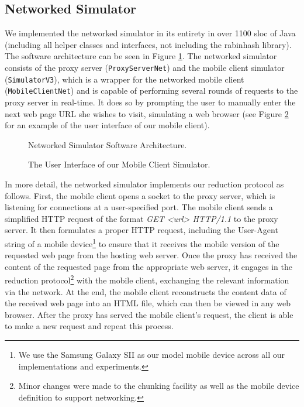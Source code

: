 \subsection{Networked Simulator}
\label{sec:netsim}
We implemented the networked simulator in its entirety in over 1100 sloc of Java (including all helper classes and interfaces, not including the rabinhash library). The software architecture can be seen in Figure \ref{fig:netsim_arch}. The networked simulator consists of the proxy server (\texttt{ProxyServerNet}) and the mobile client simulator (\texttt{SimulatorV3}), which is a wrapper for the networked mobile client (\texttt{MobileClientNet}) and is capable of performing several rounds of requests to the proxy server in real-time. It does so by prompting the user to manually enter the next web page URL she wishes to visit, simulating a web browser (see Figure \ref{fig:mobsim_ui} for an example of the user interface of our mobile client).

\begin{figure}[h] 
\caption{Networked Simulator Software Architecture.}
\label{fig:netsim_arch}
\end{figure}

\begin{figure}[h] 
\caption{The User Interface of our Mobile Client Simulator.}
\label{fig:mobsim_ui}
\end{figure}

In more detail, the networked simulator implements our reduction protocol as follows. First, the mobile client opens a socket to the proxy server, which is listening for connections at a user-specified port. The mobile client sends a simplified HTTP request of the format \emph{GET <url> HTTP/1.1} to the proxy server. It then formulates a proper HTTP request, including the User-Agent string of a mobile device\footnote{We use the Samsung Galaxy SII as our model mobile device across all our implementations and experiments.} to ensure that it receives the mobile version of the requested web page from the hosting web server. Once the proxy has received the content of the requested page from the appropriate web server, it engages in the reduction protocol\footnote{Minor changes were made to the chunking facility as well as the mobile device definition to support networking.} with the mobile client, exchanging the relevant information via the network. At the end, the mobile client reconstructs the content data of the received web page into an HTML file, which can then be viewed in any web browser. After the proxy has served the mobile client's request, the client is able to make a new request and repeat this process.


